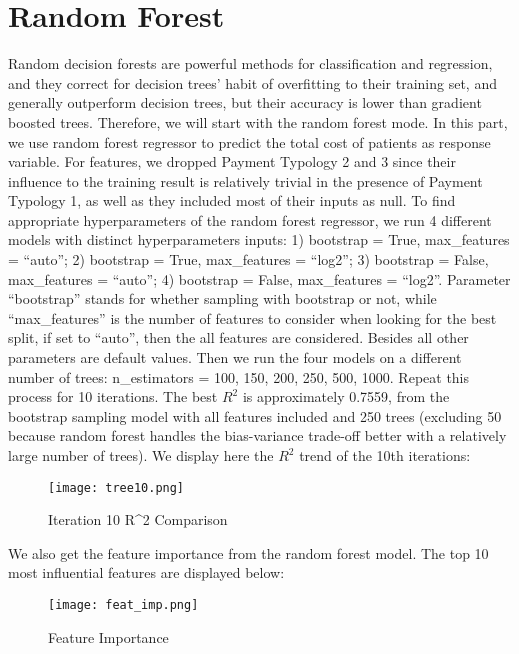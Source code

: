 \documentclass{article}
\begin{document}
\section{Random Forest}
Random decision forests are powerful methods for classification and regression, and they correct for decision trees' habit of overfitting to their training set, and generally outperform decision trees, but their accuracy is lower than gradient boosted trees.  Therefore, we will start with the random forest mode.
In this part, we use random forest regressor to predict the total cost of patients as response variable. For features, we dropped Payment Typology 2 and 3 since their influence to the training result is relatively trivial in the presence of Payment Typology 1, as well as they included most of their inputs as null.
\newline
To find appropriate hyperparameters of the random forest regressor, we run 4 different models with distinct hyperparameters inputs: 1) bootstrap = True, max\_features = “auto”; 2) bootstrap = True, max\_features = “log2”; 3) bootstrap = False, max\_features = “auto”; 4) bootstrap = False, max\_features = “log2”. Parameter “bootstrap” stands for whether sampling with bootstrap or not, while “max\_features” is the number of features to consider when looking for the best split, if set to “auto”, then the all features are considered. Besides all other parameters are default values. Then we run the four models on a different number of trees: n\_estimators = 100, 150, 200, 250, 500, 1000. Repeat this process for 10 iterations.
\newline
The best $R^2$ is approximately 0.7559, from the bootstrap sampling model with all features included and 250 trees (excluding 50 because random forest handles the bias-variance trade-off better with a relatively large number of trees). We display here the $R^2$ trend of the 10th iterations:
\begin{figure}[h!]
\centering
\texttt{[image: tree10.png]}
\caption{Iteration 10 R^2 Comparison}
\end{figure}
\newline
We also get the feature importance from the random forest model. The top 10 most influential features are displayed below:
\begin{figure}[h!]
\centering
\texttt{[image: feat\_imp.png]}
\caption{Feature Importance}
\end{figure}
\end{document}
